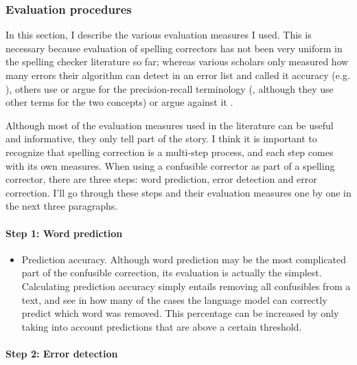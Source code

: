 \documentclass[12pt]{article}
\begin{document}
\subsubsection{Evaluation procedures} \label{eval}

In this section, I describe the various evaluation measures I used. This is necessary because evaluation of spelling correctors has not been very uniform in the spelling checker literature so far; whereas various scholars only measured how many errors their algorithm can detect in an error list and called it accuracy (e.g. \citealp{agirre98, bm00, tm02,vandelden04}), others use or argue for the precision-recall terminology (\citealp{reynaert08,pz84}, although they use other terms for the two concepts) or argue against it \citep{sp02}.\\\indent

Although most of the evaluation measures used in the literature can be useful and informative, they only tell part of the story. I think it is important to recognize that spelling correction is a multi-step process, and each step comes with its own measures. When using a confusible corrector as part of a spelling corrector, there are three steps: word prediction, error detection and error correction. I'll go through these steps and their evaluation measures one by one in the next three paragraphs.

\paragraph{Step 1: Word prediction}

\begin{itemize}
\item Prediction accuracy. Although word prediction may be the most complicated part of the confusible correction, its evaluation is actually the simplest. Calculating prediction accuracy simply entails removing all confusibles from a text, and see in how many of the cases the language model can correctly predict which word was removed. This percentage can be increased by only taking into account predictions that are above a certain threshold. 
\end{itemize}

\paragraph{Step 2: Error detection}
\end{document}
